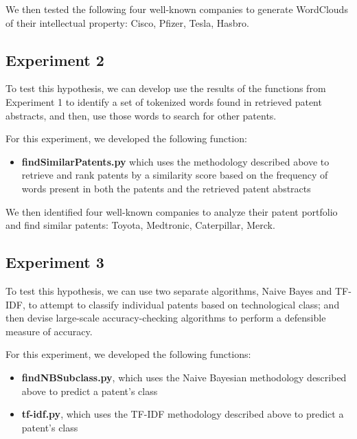 \documentclass{article}
\begin{document}
We then tested the following four well-known companies to generate WordClouds of their intellectual property: Cisco, Pfizer, Tesla, Hasbro.

\noindent{}

\subsection{Experiment 2}
To test this hypothesis, we can develop use the results of the functions from Experiment 1 to identify a set of tokenized words found in retrieved patent abstracts, and then, use those words to search for other patents.

For this experiment, we developed the following function:
\begin{itemize}
  \item \textbf{findSimilarPatents.py} which uses the methodology described above to retrieve and rank patents by a similarity score based on the frequency of words present in both the patents and the retrieved patent abstracts
\end{itemize}

We then identified four well-known companies to analyze their patent portfolio and find similar patents: Toyota, Medtronic, Caterpillar, Merck.

\noindent{}

\subsection{Experiment 3}
To test this hypothesis, we can use two separate algorithms, Naive Bayes and TF-IDF, to attempt to classify individual patents based on technological class; and then devise large-scale accuracy-checking algorithms to perform a defensible measure of accuracy.

For this experiment, we developed the following functions:
\begin{itemize}
  \item \textbf{findNBSubclass.py}, which uses the Naive Bayesian methodology described above to predict a patent’s class
  \item \textbf{tf-idf.py}, which uses the TF-IDF methodology described above to predict a patent’s class
\end{itemize}
\end{document}
